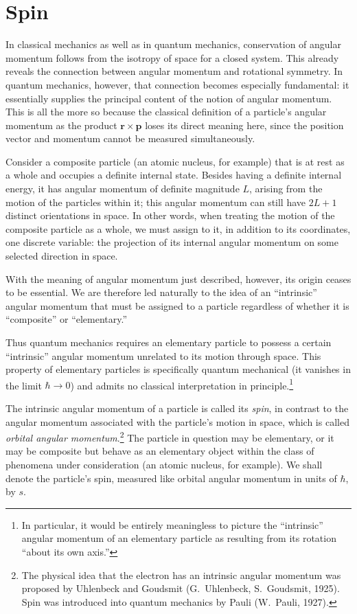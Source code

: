 \section{Spin}

In classical mechanics as well as in quantum mechanics, conservation of
angular momentum follows from the isotropy of space for a closed system. This
already reveals the connection between angular momentum and rotational
symmetry. In quantum mechanics, however, that connection becomes especially
fundamental: it essentially supplies the principal content of the notion of
angular momentum. This is all the more so because the classical definition of
a particle's angular momentum as the product
$\mathbf r\times\mathbf p$ loses its direct meaning here, since the position
vector and momentum cannot be measured simultaneously.



Consider a composite particle (an atomic nucleus, for example) that is at rest
as a whole and occupies a definite internal state. Besides having a definite
internal energy, it has angular momentum of definite magnitude $L$, arising
from the motion of the particles within it; this angular momentum can still
have $2L+1$ distinct orientations in space. In other words, when treating the
motion of the composite particle as a whole, we must assign to it, in addition
to its coordinates, one discrete variable: the projection of its internal
angular momentum on some selected direction in space.

With the meaning of angular momentum just described, however, its origin
ceases to be essential. We are therefore led naturally to the idea of an
``intrinsic'' angular momentum that must be assigned to a particle regardless
of whether it is ``composite'' or ``elementary.''

Thus quantum mechanics requires an elementary particle to possess a certain
``intrinsic'' angular momentum unrelated to its motion through space. This
property of elementary particles is specifically quantum mechanical (it
vanishes in the limit $\hbar\to0$) and admits no classical interpretation in
principle.\footnote{In particular, it would be entirely meaningless to picture
the ``intrinsic'' angular momentum of an elementary particle as resulting from
its rotation ``about its own axis.''}

The intrinsic angular momentum of a particle is called its \emph{spin}, in
contrast to the angular momentum associated with the particle's motion in
space, which is called \emph{orbital angular momentum}.\footnote{The physical
idea that the electron has an intrinsic angular momentum was proposed by
Uhlenbeck and Goudsmit (G.~Uhlenbeck, S.~Goudsmit, 1925). Spin was introduced
into quantum mechanics by Pauli (W.~Pauli, 1927).} The particle in question
may be elementary, or it may be composite but behave as an elementary object
within the class of phenomena under consideration (an atomic nucleus, for
example). We shall denote the particle's spin, measured like orbital angular
momentum in units of $\hbar$, by $s$.

